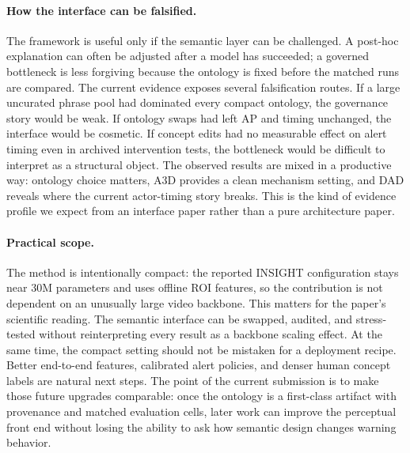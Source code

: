 \documentclass[11pt]{article}
\newcommand{\method}{\textsc{INSIGHT}}
\begin{document}
\paragraph{How the interface can be falsified.}
The framework is useful only if the semantic layer can be challenged. A
post-hoc explanation can often be adjusted after a model has succeeded; a
governed bottleneck is less forgiving because the ontology is fixed before the
matched runs are compared. The current evidence exposes several falsification
routes. If a large uncurated phrase pool had dominated every compact ontology,
the governance story would be weak. If ontology swaps had left AP and timing
unchanged, the interface would be cosmetic. If concept edits had no measurable
effect on alert timing even in archived intervention tests, the bottleneck
would be difficult to interpret as a structural object. The observed results
are mixed in a productive way: ontology choice matters, A3D provides a clean
mechanism setting, and DAD reveals where the current actor-timing story breaks.
This is the kind of evidence profile we expect from an interface paper rather
than a pure architecture paper.

\paragraph{Practical scope.}
The method is intentionally compact: the reported \method{} configuration stays
near 30M parameters and uses offline ROI features, so the contribution is not
dependent on an unusually large video backbone. This matters for the paper's
scientific reading. The semantic interface can be swapped, audited, and
stress-tested without reinterpreting every result as a backbone scaling effect.
At the same time, the compact setting should not be mistaken for a deployment
recipe. Better end-to-end features, calibrated alert policies, and denser human
concept labels are natural next steps. The point of the current submission is
to make those future upgrades comparable: once the ontology is a first-class
artifact with provenance and matched evaluation cells, later work can improve
the perceptual front end without losing the ability to ask how semantic design
changes warning behavior.
\end{document}

